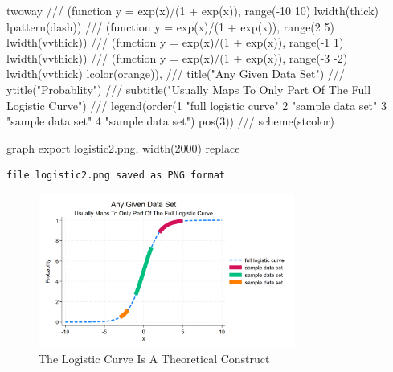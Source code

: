 \documentclass[
  letterpaper,
  DIV=11,
  numbers=noendperiod]{scrartcl}
\newenvironment{Shaded}{\begin{snugshade}}{\end{snugshade}}
\newcommand{\BaseNTok}[1]{\textcolor[rgb]{0.68,0.00,0.00}{#1}}
\newcommand{\CommentTok}[1]{\textcolor[rgb]{0.37,0.37,0.37}{#1}}
\newcommand{\DecValTok}[1]{\textcolor[rgb]{0.68,0.00,0.00}{#1}}
\newcommand{\FunctionTok}[1]{\textcolor[rgb]{0.28,0.35,0.67}{#1}}
\newcommand{\KeywordTok}[1]{\textcolor[rgb]{0.00,0.23,0.31}{#1}}
\newcommand{\NormalTok}[1]{\textcolor[rgb]{0.00,0.23,0.31}{#1}}
\newcommand{\StringTok}[1]{\textcolor[rgb]{0.13,0.47,0.30}{#1}}
\begin{document}
\begin{Shaded}
\begin{Highlighting}[]

\KeywordTok{twoway} \CommentTok{///}
\NormalTok{(}\KeywordTok{function} \FunctionTok{y}\NormalTok{ = }\FunctionTok{exp}\NormalTok{(x)/(1 + }\FunctionTok{exp}\NormalTok{(x)), }\KeywordTok{range}\NormalTok{({-}10 10) lwidth(thick) lpattern(}\KeywordTok{dash}\NormalTok{)) }\CommentTok{///}
\NormalTok{(}\KeywordTok{function} \FunctionTok{y}\NormalTok{ = }\FunctionTok{exp}\NormalTok{(x)/(1 + }\FunctionTok{exp}\NormalTok{(x)), }\KeywordTok{range}\NormalTok{(2 5) lwidth(vvthick)) }\CommentTok{///}
\NormalTok{(}\KeywordTok{function} \FunctionTok{y}\NormalTok{ = }\FunctionTok{exp}\NormalTok{(x)/(1 + }\FunctionTok{exp}\NormalTok{(x)), }\KeywordTok{range}\NormalTok{({-}1 1) lwidth(vvthick)) }\CommentTok{///}
\NormalTok{(}\KeywordTok{function} \FunctionTok{y}\NormalTok{ = }\FunctionTok{exp}\NormalTok{(x)/(1 + }\FunctionTok{exp}\NormalTok{(x)), }\KeywordTok{range}\NormalTok{({-}3 {-}2) lwidth(vvthick) lcolor(}\BaseNTok{orange}\NormalTok{)), }\CommentTok{///}
\BaseNTok{title}\NormalTok{(}\StringTok{"Any Given Data Set"}\NormalTok{) }\CommentTok{///}
\BaseNTok{ytitle}\NormalTok{(}\StringTok{"Probablity"}\NormalTok{) }\CommentTok{///}
\BaseNTok{subtitle}\NormalTok{(}\StringTok{"Usually Maps To Only Part Of The Full Logistic Curve"}\NormalTok{) }\CommentTok{///}
\BaseNTok{legend}\NormalTok{(}\KeywordTok{order}\NormalTok{(1 }\StringTok{"full logistic curve"}\NormalTok{ 2 }\StringTok{"sample data set"}\NormalTok{ 3 }\StringTok{"sample data set"}\NormalTok{ 4 }\StringTok{"sample data set"}\NormalTok{) pos(3)) }\CommentTok{///}
\DecValTok{scheme}\NormalTok{(stcolor)}

\KeywordTok{graph} \KeywordTok{export}\NormalTok{ logistic2.png, }\KeywordTok{width}\NormalTok{(2000) }\KeywordTok{replace}
\end{Highlighting}
\end{Shaded}

\begin{verbatim}
file logistic2.png saved as PNG format
\end{verbatim}

\begin{figure}

{\centering \includegraphics[width=0.75\textwidth,height=\textheight]{logistic2.png}

}

\caption{The Logistic Curve Is A Theoretical Construct}

\end{figure}
\end{document}
